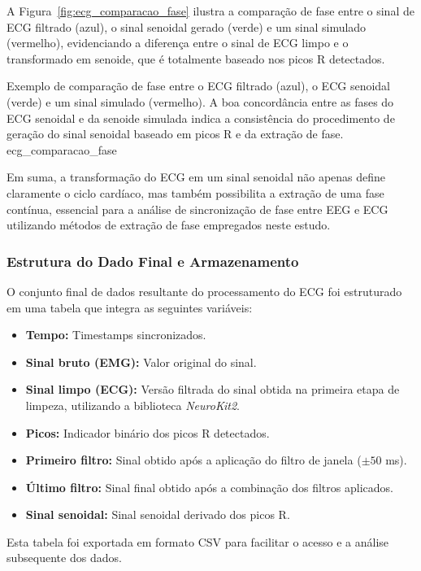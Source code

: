 A Figura~\ref{fig:ecg_comparacao_fase} ilustra a comparação de fase entre o sinal de ECG filtrado (azul), o sinal senoidal gerado (verde) e um sinal simulado (vermelho), evidenciando a diferença entre o sinal de ECG limpo e o transformado em senoide, que é totalmente baseado nos picos R detectados.

{Exemplo de comparação de fase entre o ECG filtrado (azul), o ECG senoidal (verde) e um sinal simulado (vermelho). A boa concordância entre as fases do ECG senoidal e da senoide simulada indica a consistência do procedimento de geração do sinal senoidal baseado em picos R e da extração de fase.}
{ecg_comparacao_fase}

Em suma, a transformação do ECG em um sinal senoidal não apenas define claramente o ciclo cardíaco, mas também possibilita a extração de uma fase contínua, essencial para a análise de sincronização de fase entre EEG e ECG utilizando métodos de extração de fase empregados neste estudo.

\subsubsection{Estrutura do Dado Final e Armazenamento}
O conjunto final de dados resultante do processamento do ECG foi estruturado em uma tabela que integra as seguintes variáveis:
\begin{itemize}
    \item \textbf{Tempo:} Timestamps sincronizados.
    \item \textbf{Sinal bruto (EMG):} Valor original do sinal.
    \item \textbf{Sinal limpo (ECG):} Versão filtrada do sinal obtida na primeira etapa de limpeza, utilizando a biblioteca \textit{NeuroKit2}.
    \item \textbf{Picos:} Indicador binário dos picos R detectados.
    \item \textbf{Primeiro filtro:} Sinal obtido após a aplicação do filtro de janela (\(\pm50\) ms).
    \item \textbf{Último filtro:} Sinal final obtido após a combinação dos filtros aplicados.
    \item \textbf{Sinal senoidal:} Sinal senoidal derivado dos picos R.
\end{itemize}

Esta tabela foi exportada em formato CSV para facilitar o acesso e a análise subsequente dos dados.